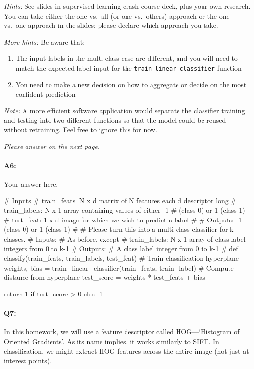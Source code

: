 \emph{Hints:} See slides in supervised learning crash course deck, plus your own research. You can take either the one vs.~all (or one vs.~others) approach or the one vs.~one approach in the slides; please declare which approach you take.

\emph{More hints:} Be aware that:
\begin{enumerate}
    \item The input labels in the multi-class case are different, and you will need to match the expected label input for the \texttt{train\_linear\_classifier} function
    \item You need to make a new decision on how to aggregate or decide on the most confident prediction
\end{enumerate}

\emph{Note:} A more efficient software application would separate the classifier training and testing into two different functions so that the model could be reused without retraining. Feel free to ignore this for now.

\emph{Please answer on the next page.}

\pagebreak
\paragraph{A6:} Your answer here.

\begin{python}
# Inputs
#   train_feats: N x d matrix of N features each d descriptor long
#   train_labels: N x 1 array containing values of either -1 
#               (class 0) or 1 (class 1)
#   test_feat: 1 x d image for which we wish to predict a label
#
#   Outputs: -1 (class 0) or 1 (class 1)
#
# Please turn this into a multi-class classifier for k classes.
# Inputs:
#    As before, except
#    train_labels: N x 1 array of class label integers from 0 to k-1
# Outputs:
#    A class label integer from 0 to k-1
#
def classify(train_feats, train_labels, test_feat)
    # Train classification hyperplane
    weights, bias = train_linear_classifier(train_feats, train_label)
    # Compute distance from hyperplane
    test_score = weights * test_feats + bias

    return 1 if test_score > 0 else -1
\end{python}


\pagebreak

\paragraph{Q7:} In this homework, we will use a feature descriptor called HOG---`Histogram of Oriented Gradients'. As its name implies, it works similarly to SIFT. In classification, we might extract HOG features across the entire image (not just at interest points).


